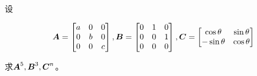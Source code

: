 \begin{problem}\label{problem-1.6}
设

\begin{equation*}
    \boldsymbol{A}=\begin{bmatrix}a&0&0\\0&b&0\\0&0&c\end{bmatrix},
    \boldsymbol{B}=\begin{bmatrix}0&1&0\\0&0&1\\0&0&0\end{bmatrix},
    \boldsymbol{C}=\begin{bmatrix}\cos \theta&\sin \theta\\-\sin \theta&\cos \theta\end{bmatrix}
\end{equation*}

求\(\boldsymbol{A}^5,\boldsymbol{B}^3,\boldsymbol{C}^n\)。
\end{problem}
